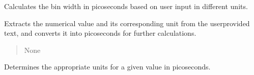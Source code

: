 \documentclass[letterpaper,10pt,english]{sphinxmanual}
\begin{document}
\begin{fulllineitems}
\begin{fulllineitems}
\begin{quote}
\begin{description}
\end{description}\end{quote}

\end{fulllineitems}


\begin{fulllineitems}
\label{\detokenize{FLIMGraphics:FLIMGraphics.WorkerThreadFLIM.createdSignal}}
\pysigstartsignatures
{}
\pysigstopsignatures
\end{fulllineitems}


\begin{fulllineitems}
\label{\detokenize{FLIMGraphics:FLIMGraphics.WorkerThreadFLIM.getBinWidthNumber}}
\pysigstartsignatures
{}
\pysigstopsignatures
\sphinxAtStartPar
Calculates the bin width in picoseconds based on user input in different units.

\sphinxAtStartPar
Extracts the numerical value and its corresponding unit from the user\sphinxhyphen{}provided text,
and converts it into picoseconds for further calculations.
\begin{quote}\begin{description}
\sphinxAtStartPar
None

\end{description}\end{quote}

\end{fulllineitems}


\begin{fulllineitems}
\label{\detokenize{FLIMGraphics:FLIMGraphics.WorkerThreadFLIM.getUnits}}
\pysigstartsignatures
{}
\pysigstopsignatures
\sphinxAtStartPar
Determines the appropriate units for a given value in picoseconds.


\end{fulllineitems}
\end{fulllineitems}
\end{document}

